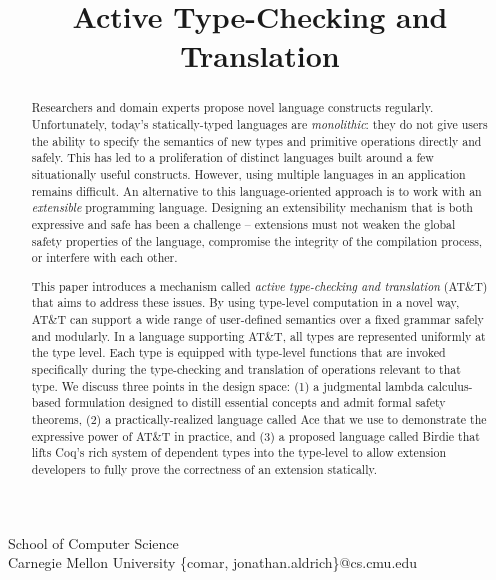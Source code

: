 \documentclass[10pt]{sigplanconf}
\begin{document}


\title{Active Type-Checking and Translation}

       {School of Computer Science\\
        Carnegie Mellon University}
        {\{comar, jonathan.aldrich\}@cs.cmu.edu}   

\maketitle
\begin{abstract}
Researchers and domain experts propose novel language constructs regularly. Unfortunately, today's statically-typed languages are {\it monolithic}: they do not give users the ability to specify the semantics of new types and primitive operations directly and safely. This has led to a   proliferation of distinct languages built around a few situationally useful  constructs. However, using multiple languages in an application remains difficult. 
An alternative to this language-oriented approach is to work with an {\it extensible} programming language. Designing an extensibility mechanism that is both expressive and safe has been a challenge -- extensions must not weaken the global safety properties of the language, compromise the integrity of the compilation process, or interfere with each other. 

This paper introduces a mechanism called {\it active type-checking and translation} (AT\&T) that aims to address these issues. By using type-level computation in a novel way, AT\&T can support a wide range of user-defined semantics over a fixed grammar safely and modularly. 
In a language supporting AT\&T, all types are represented uniformly at the type level. Each type is equipped with type-level functions that are invoked specifically during the type-checking and translation of operations relevant to that type. 
We discuss three points in the design space: (1) a judgmental lambda calculus-based  formulation designed to distill essential concepts and admit formal safety theorems, (2) a practically-realized language called Ace that we use to demonstrate the expressive power of AT\&T in practice, and (3) a proposed language called Birdie that lifts Coq's rich system of dependent types into the type-level to allow extension developers to fully prove the correctness of an extension statically.

\end{abstract}
\end{document}
